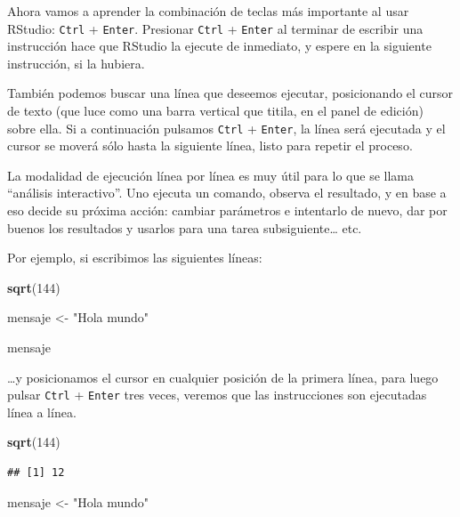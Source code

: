 \documentclass[]{book}
\newenvironment{Shaded}{\begin{snugshade}}{\end{snugshade}}
\newcommand{\KeywordTok}[1]{\textcolor[rgb]{0.13,0.29,0.53}{\textbf{#1}}}
\newcommand{\DecValTok}[1]{\textcolor[rgb]{0.00,0.00,0.81}{#1}}
\newcommand{\StringTok}[1]{\textcolor[rgb]{0.31,0.60,0.02}{#1}}
\newcommand{\NormalTok}[1]{#1}
\begin{document}
Ahora vamos a aprender la combinación de teclas más importante al usar
RStudio: \texttt{Ctrl} + \texttt{Enter}. Presionar \texttt{Ctrl} +
\texttt{Enter} al terminar de escribir una instrucción hace que RStudio
la ejecute de inmediato, y espere en la siguiente instrucción, si la
hubiera.

También podemos buscar una línea que deseemos ejecutar, posicionando el
cursor de texto (que luce como una barra vertical que titila, en el
panel de edición) sobre ella. Si a continuación pulsamos \texttt{Ctrl} +
\texttt{Enter}, la línea será ejecutada y el cursor se moverá sólo hasta
la siguiente línea, listo para repetir el proceso.

La modalidad de ejecución línea por línea es muy útil para lo que se
llama ``análisis interactivo''. Uno ejecuta un comando, observa el
resultado, y en base a eso decide su próxima acción: cambiar parámetros
e intentarlo de nuevo, dar por buenos los resultados y usarlos para una
tarea subsiguiente\ldots{} etc.

Por ejemplo, si escribimos las siguientes líneas:

\begin{Shaded}
\begin{Highlighting}[]
\KeywordTok{sqrt}\NormalTok{(}\DecValTok{144}\NormalTok{)}

\NormalTok{mensaje <-}\StringTok{ "Hola mundo"}

\NormalTok{mensaje}
\end{Highlighting}
\end{Shaded}

\ldots{}y posicionamos el cursor en cualquier posición de la primera
línea, para luego pulsar \texttt{Ctrl} + \texttt{Enter} tres veces,
veremos que las instrucciones son ejecutadas línea a línea.

\begin{Shaded}
\begin{Highlighting}[]
\KeywordTok{sqrt}\NormalTok{(}\DecValTok{144}\NormalTok{)}
\end{Highlighting}
\end{Shaded}

\begin{verbatim}
## [1] 12
\end{verbatim}

\begin{Shaded}
\begin{Highlighting}[]
\NormalTok{mensaje <-}\StringTok{ "Hola mundo"}
\end{Highlighting}
\end{Shaded}
\end{document}
